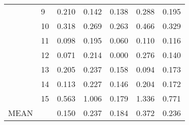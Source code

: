\begin{table}
\begin{tabular}{llrrrrr}
 & 9 & 0.210 & 0.142 & 0.138 & 0.288 & 0.195 \\
 & 10 & 0.318 & 0.269 & 0.263 & 0.466 & 0.329 \\
 & 11 & 0.098 & 0.195 & 0.060 & 0.110 & 0.116 \\
 & 12 & 0.071 & 0.214 & 0.000 & 0.276 & 0.140 \\
 & 13 & 0.205 & 0.237 & 0.158 & 0.094 & 0.173 \\
 & 14 & 0.113 & 0.227 & 0.146 & 0.204 & 0.172 \\
 & 15 & 0.563 & 1.006 & 0.179 & 1.336 & 0.771 \\
\cline{1-7}
MEAN &  & 0.150 & 0.237 & 0.184 & 0.372 & 0.236 \\
\cline{1-7}
\bottomrule
\end{tabular}
\end{table}
